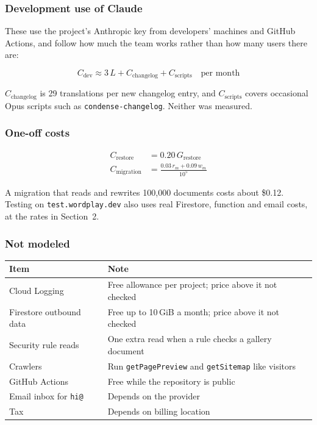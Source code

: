 \documentclass{article}
\begin{document}
\subsubsection{Development use of Claude}

These use the project's Anthropic key from developers' machines and GitHub
Actions, and follow how much the team works rather than how many users there
are:

\[
C_{\text{dev}} \approx 3\,L + C_{\text{changelog}} + C_{\text{scripts}}
\quad \text{per month}
\]

$C_{\text{changelog}}$ is 29 translations per new changelog entry, and
$C_{\text{scripts}}$ covers occasional Opus scripts such as
\texttt{condense-changelog}. Neither was measured.

\subsubsection{One-off costs}

\begin{align*}
C_{\text{restore}} &= 0.20\,G_{\text{restore}} \\
C_{\text{migration}} &= \frac{0.03\,r_m + 0.09\,w_m}{10^{5}}
\end{align*}

A migration that reads and rewrites 100{,}000 documents costs about \$0.12.
Testing on \texttt{test.wordplay.dev} also uses real Firestore, function and
email costs, at the rates in Section~2.

\subsubsection{Not modeled}

\begin{center}
\begin{tabular}{ll}
\toprule
Item & Note \\
\midrule
Cloud Logging & Free allowance per project; price above it not checked \\
Firestore outbound data & Free up to 10\,GiB a month; price above it not checked \\
Security rule reads & One extra read when a rule checks a gallery document \\
Crawlers & Run \texttt{getPagePreview} and \texttt{getSitemap} like visitors \\
GitHub Actions & Free while the repository is public \\
Email inbox for \texttt{hi@} & Depends on the provider \\
Tax & Depends on billing location \\
\bottomrule
\end{tabular}
\end{center}
\end{document}
